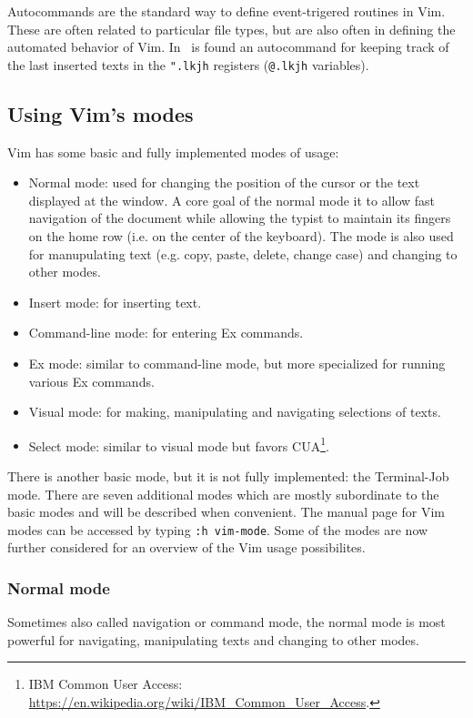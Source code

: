 \documentclass{article}
\newcommand{\tttt}[1]{\texttt{#1}}
\begin{document}
Autocommands are the standard way to define event-trigered routines in Vim.
These are often related to particular file types, but are also often
in defining the automated behavior of Vim.
In~\cite{vimrc} is found an autocommand for keeping track of the last inserted texts
in the \tttt{".lkjh} registers (\tttt{@.lkjh} variables).

\subsection{Using Vim's modes}\label{modes}
Vim has some basic and fully implemented modes of usage:
\begin{itemize}
  \item Normal mode: used for changing
  the position of the cursor or the text displayed
  at the window.
  A core goal of the normal mode it to allow fast
  navigation of the document while allowing
  the typist to maintain its fingers on the home row
  (i.e. on the center of the keyboard).
  The mode is also used for manupulating text
  (e.g. copy, paste, delete, change case) and
    changing to other modes.
  \item Insert mode: for inserting text.
  \item Command-line mode: for entering Ex commands.
  \item Ex mode: similar to command-line mode,
  but more specialized for running various Ex commands.
  \item Visual mode: for making, manipulating and navigating
  selections of texts.
  \item Select mode: similar to visual mode but
  favors CUA\footnote{IBM Common User Access: \url{https://en.wikipedia.org/wiki/IBM_Common_User_Access}.}.
\end{itemize}

There is another basic mode, but it is not fully implemented:
the Terminal-Job mode.
There are seven additional modes which are mostly subordinate 
to the basic modes and will be described when convenient.
The manual page for Vim modes can be accessed by typing
\texttt{:h vim-mode}.
Some of the modes are now further considered for
an overview of the Vim usage possibilites.

\subsubsection{Normal mode}\label{normal}
Sometimes also called navigation or command mode,
the normal mode is most powerful for
navigating, manipulating texts and changing to other modes.
\end{document}
